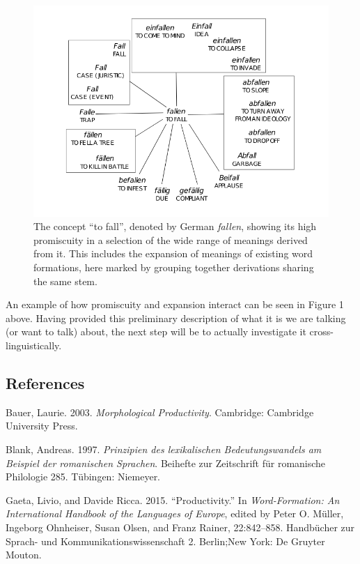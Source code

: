 \documentclass[
  english,
  a4paper,
  oneside,tablecaptionabove
]{scrbook}
\begin{document}
\begin{figure}
\centering
\includegraphics{images/__f.hypotheses.org_wp-content_blogs.dir_4500_files_2018_11_fallen.png}
\caption{The concept \enquote{to fall}, denoted by
German \emph{fallen}, showing its high promiscuity in a selection of
the wide range of meanings derived from it. This includes the expansion
of meanings of existing word formations, here marked by grouping
together derivations sharing the same stem.}
\end{figure}

An example of how promiscuity and expansion interact can be seen in
Figure 1 above. Having provided this preliminary description of what it
is we are talking (or want to talk) about, the next step will be to
actually investigate it cross-linguistically.

\hypertarget{references}{\subsection*{References}\label{references}}

Bauer, Laurie. 2003. \emph{Morphological Productivity}. Cambridge:
Cambridge University Press.

Blank, Andreas. 1997. \emph{Prinzipien des lexikalischen
Bedeutungswandels am Beispiel der romanischen Sprachen}. Beihefte zur
Zeitschrift für romanische Philologie 285. Tübingen: Niemeyer.

Gaeta, Livio, and Davide Ricca. 2015. \enquote{Productivity.} In
\emph{Word-Formation: An International Handbook of the Languages of
Europe}, edited by Peter O. Müller, Ingeborg Ohnheiser, Susan Olsen,
and Franz Rainer, 22:842--858. Handbücher zur Sprach- und
Kommunikationswissenschaft 2. Berlin;New York: De Gruyter Mouton.
\end{document}
